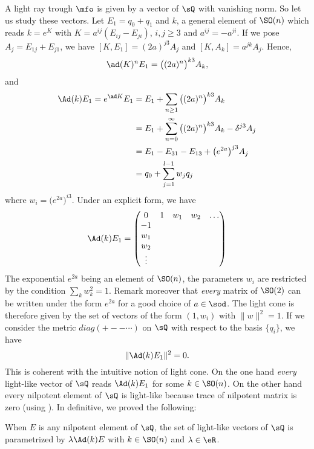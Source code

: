 A light ray trough $\mfo$ is given by a vector of $\sQ$ with vanishing norm. So let us study these vectors. Let $E_1=q_0+q_1$ and $k$, a general element of  $\SO(n)$ which reads $k= e^{K}$ with $K=a^{ij}(E_{ij}-E_{ji})$, $i,j\geq 3$ and $a^{ij}=-a^{ji}$.  If we pose $A_j=E_{1j}+E_{j1}$, we have $[K,E_1]=(2a)^{j3}A_j$ and $[K,A_k]=a^{jk}A_j$. Hence,
\[
	\ad(K)^nE_1=\big((2a)^n\big)^{k3}A_k,
\]
and
\begin{equation} \label{eq:Adkeu}
	\begin{split}
		\Ad(k)E_1=e^{\ad K}E_1 & =E_1+\sum_{n\geq 1}\big( (2a)^n\big)^{k3}A_k                       \\
		                       & =E_1+\sum_{n=0}^{\infty}\big(  (2a)^n \big)^{k3}A_k-\delta^{j3}A_j \\
		                       & =E_1-E_{31}-E_{13}+\big( e^{2a}\big)^{j3}A_j                       \\
		                       & =q_0+\sum_{j=1}^{l-1}w_jq_j
	\end{split}
\end{equation}
where $w_i=\big(  e^{2a} \big)^{i3}$. Under an explicit form, we have
\begin{equation} \label{eq:AdkE}
	\Ad(k)E_1=
	\begin{pmatrix}
		0 & 1 & w_1 & w_2 & \ldots \\
		-1                         \\
		w_1                        \\
		w_2                        \\
		\vdots
	\end{pmatrix}
\end{equation}
The exponential $ e^{2a}$ being an element of $\SO(n)$, the parameters $w_i$ are restricted by the condition $\sum_{k}w_k^2=1$.  Remark moreover that \emph{every} matrix of $\SO(2)$ can be written under the form $e^{2a}$ for a good choice of $a\in\sod$. The light cone is therefore given by the set of vectors of the form $(1,w_i)$ with $\|w\|^2=1$. If we consider the metric $diag(+--\cdots)$ on $\sQ$ with respect to the basis $\{q_i\}$, we have
\[
	\|\Ad(k)E_1\|^2=0.
\]
This is coherent with the intuitive notion of light cone. On the one hand \emph{every} light-like vector of $\sQ$ reads $\Ad(k)E_1$ for some $k\in\SO(n)$. On the other hand every nilpotent element of $\sQ$ is light-like because trace of nilpotent matrix is zero (using ). In definitive, we proved the following:

\begin{proposition}		\label{PropNormZeroEQnil}
	When $E$ is any nilpotent element of $\sQ$, the set of light-like vectors of $\sQ$ is parametrized by $\lambda\Ad(k)E$ with $k\in\SO(n)$ and $\lambda\in\eR$.
	\label{PropToutVectLumQ}
\end{proposition}

